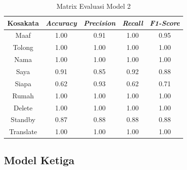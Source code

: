 \begin{longtable}{|c|c|c|c|c|}
  \caption{Matrix Evaluasi Model 2}
  \label{tb:model2stat}                                   \\
  \hline
  \rowcolor[HTML]{C0C0C0}
  \textbf{Kosakata} & \textbf{\emph{Accuracy}} & \textbf{\emph{Precision}} & \textbf{\emph{Recall}} & \textbf{\emph{F1-Score}} \\
  \hline
  Maaf              & 1.00                        & 0.91                        & 1.00                   & 0.95                \\
  Tolong            & 1.00                        & 1.00                        & 1.00                   & 1.00                \\
  Nama              & 1.00                        & 1.00                        & 1.00                   & 1.00                \\
  Saya              & 0.91                        & 0.85                        & 0.92                   & 0.88                \\
  Siapa             & 0.62                        & 0.93                        & 0.62                   & 0.71                \\
  Rumah             & 1.00                        & 1.00                        & 1.00                   & 1.00                \\
  Delete            & 1.00                        & 1.00                        & 1.00                   & 1.00                \\
  Standby           & 0.87                        & 0.88                        & 0.88                   & 0.88                \\
  Translate         & 1.00                        & 1.00                        & 1.00                   & 1.00                \\
  \hline
\end{longtable}

\subsection{Model Ketiga}
\label{sec:analisismodel3}

